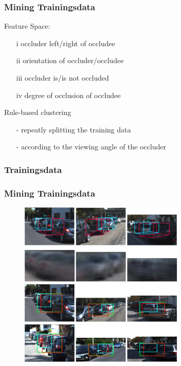 \documentclass[xcolor=dvipsnames]{beamer}
\begin{document}
\begin{frame}
	\frametitle{Mining Trainingsdata}
	\Large
	Feature Space: \\
	\begin{itemize}
		\item[i]   occluder left/right of occludee
		\item[ii]  orientation of occluder/occludee
		\item[iii] occluder is/is not occluded
		\item[iv] degree of occlusion of occludee
 	\end{itemize}
 	\vspace{1cm}
 	Rule-based clustering
 	\begin{itemize}
	 	\item[-] repeatly splitting the training data
	 	\item[-] according to the viewing angle of the occluder
 	\end{itemize}
\end{frame}

\subsubsection{Trainingsdata}
\begin{frame}
	\frametitle{Mining Trainingsdata}
	\begin{figure}
	\includegraphics[width=0.7\textwidth]{img/dpmoc_2.png}
	\end{figure}
\end{frame}
\end{document}

